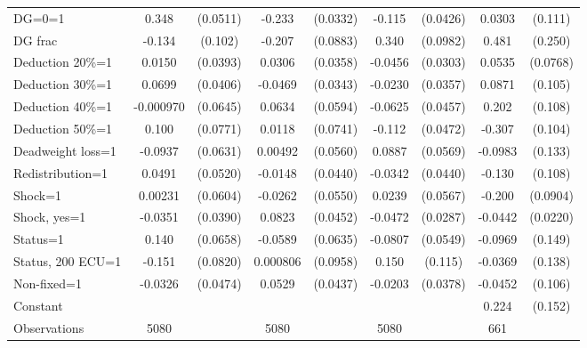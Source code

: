 \begin{tabular}{l|cccccc|cc}
DG=0=1          &    0.348\sym{***}& (0.0511)&   -0.233\sym{***}& (0.0332)&   -0.115\sym{***}& (0.0426)&   0.0303         &  (0.111)\\
DG frac         &   -0.134         &  (0.102)&   -0.207\sym{**} & (0.0883)&    0.340\sym{***}& (0.0982)&    0.481\sym{*}  &  (0.250)\\
Deduction 20\%=1&   0.0150         & (0.0393)&   0.0306         & (0.0358)&  -0.0456         & (0.0303)&   0.0535         & (0.0768)\\
Deduction 30\%=1&   0.0699\sym{*}  & (0.0406)&  -0.0469         & (0.0343)&  -0.0230         & (0.0357)&   0.0871         &  (0.105)\\
Deduction 40\%=1&-0.000970         & (0.0645)&   0.0634         & (0.0594)&  -0.0625         & (0.0457)&    0.202\sym{*}  &  (0.108)\\
Deduction 50\%=1&    0.100         & (0.0771)&   0.0118         & (0.0741)&   -0.112\sym{**} & (0.0472)&   -0.307\sym{***}&  (0.104)\\
Deadweight loss=1&  -0.0937         & (0.0631)&  0.00492         & (0.0560)&   0.0887         & (0.0569)&  -0.0983         &  (0.133)\\
Redistribution=1&   0.0491         & (0.0520)&  -0.0148         & (0.0440)&  -0.0342         & (0.0440)&   -0.130         &  (0.108)\\
Shock=1         &  0.00231         & (0.0604)&  -0.0262         & (0.0550)&   0.0239         & (0.0567)&   -0.200\sym{**} & (0.0904)\\
Shock, yes=1    &  -0.0351         & (0.0390)&   0.0823\sym{*}  & (0.0452)&  -0.0472         & (0.0287)&  -0.0442\sym{**} & (0.0220)\\
Status=1        &    0.140\sym{**} & (0.0658)&  -0.0589         & (0.0635)&  -0.0807         & (0.0549)&  -0.0969         &  (0.149)\\
Status, 200 ECU=1&   -0.151\sym{*}  & (0.0820)& 0.000806         & (0.0958)&    0.150         &  (0.115)&  -0.0369         &  (0.138)\\
Non-fixed=1     &  -0.0326         & (0.0474)&   0.0529         & (0.0437)&  -0.0203         & (0.0378)&  -0.0452         &  (0.106)\\
Constant        &                  &         &                  &         &                  &         &    0.224         &  (0.152)\\
\hline
Observations    &     5080         &         &     5080         &         &     5080         &         &      661         &         \\

\end{tabular}
